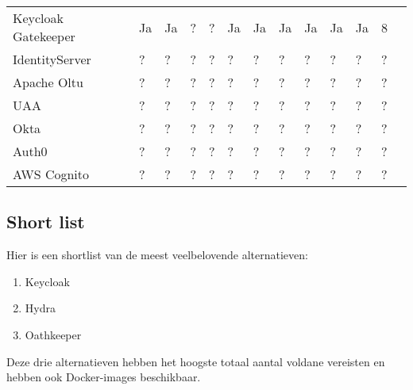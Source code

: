 \begin{table}[htbp]
\begin{adjustbox}{width=1\textwidth}
\begin{tabular}{@{}lllllllllllll@{}}
    Keycloak Gatekeeper & Ja       & Ja        & ?                   & ?               & Ja               & Ja             & Ja         & Ja         & Ja             & Ja          & 8      \\
    IdentityServer & ?             & ?         & ?                   & ?               & ?                & ?              & ?          & ?          & ?              & ?           & ?      \\
    Apache Oltu   & ?             & ?         & ?                   & ?               & ?                & ?              & ?          & ?          & ?              & ?           & ?      \\
    UAA           & ?             & ?         & ?                   & ?               & ?                & ?              & ?          & ?          & ?              & ?           & ?      \\
    Okta          & ?             & ?         & ?                   & ?               & ?                & ?              & ?          & ?          & ?              & ?           & ?      \\
    Auth0         & ?             & ?         & ?                   & ?               & ?                & ?              & ?          & ?          & ?              & ?           & ?      \\
    AWS Cognito   & ?             & ?         & ?                   & ?               & ?                & ?              & ?          & ?          & ?              & ?           & ?      \\
    \bottomrule
  \end{tabular}
  \end{adjustbox}
\end{table}

\subsection{Short list}%
\label{subsec:short-list}
Hier is een shortlist van de meest veelbelovende alternatieven:
\begin{enumerate}
    \item Keycloak
    \item Hydra
    \item Oathkeeper
\end{enumerate}

Deze drie alternatieven hebben het hoogste totaal aantal voldane vereisten en hebben ook Docker-images beschikbaar.

